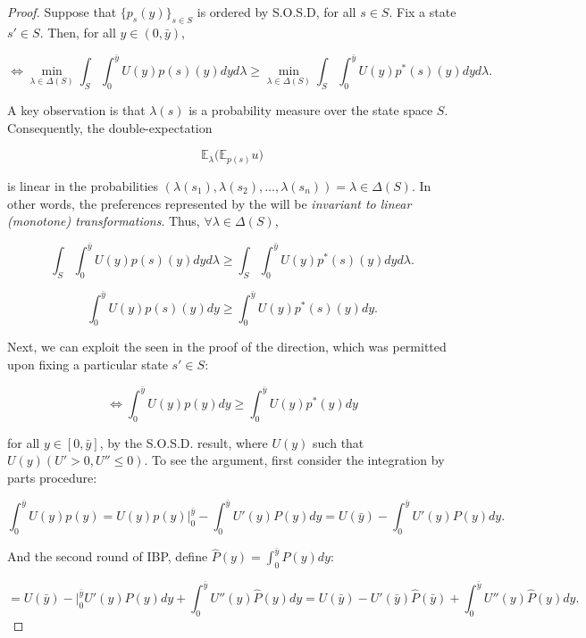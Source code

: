 \documentclass[\econtexRoot/IneqMeas]{subfiles}
\begin{document}
\begin{proof}

	\par Suppose that $\{ p_s(y) \}_{s \in S}$ is ordered by S.O.S.D, for all $s \in S$. Fix a state $s' \in S$. Then, for all $y \in (0, \bar{y})$,
	
$$  \iff  \min_{\lambda \in \Delta(S)} \int_{S} \int_{0}^{\bar{y}} U(y)p(s)(y) dy d \lambda \geq  \min_{\lambda \in \Delta(S)} \int_{S} \int_{0}^{\bar{y}} U(y)p^{*}(s)(y) dy  d \lambda. $$
	
	\par A key observation is that $\lambda(s)$ is a probability measure over the state space $S$. Consequently, the double-expectation 
	
$$ \mathbb{E}_{\lambda} \bigg( \mathbb{E}_{p(s)} u \bigg) $$

	\par is linear in the probabilities $(\lambda(s_1), \lambda(s_2), \ldots, \lambda(s_n)) = \lambda \in \Delta(S)$. In other words, the preferences represented by the  will be \textit{invariant to linear (monotone) transformations}. Thus, $\forall \lambda \in \Delta(S)$,
	
$$ \int_{S} \int_{0}^{\bar{y}} U(y)p(s)(y) dy d \lambda \geq \int_{S} \int_{0}^{\bar{y}} U(y)p^*(s)(y) dy d \lambda.$$	

$$  \int_{0}^{\bar{y}} U(y)p(s)(y) dy  \geq \int_{0}^{\bar{y}} U(y)p^*(s)(y) dy .$$	
	
	\par Next, we can exploit the  seen in the proof of the \say{$\rightarrow$} direction, which was permitted upon fixing a particular state $s' \in S$:
	
$$ \iff \int_{0}^{\bar{y}} U(y)p(y) dy \geq \int_{0}^{\bar{y}} U(y)p^*(y) dy  $$	

	\par for all $y \in [0, \bar{y}]$, by the S.O.S.D. result, where $U(y)$ such that $U(y) (U' > 0, U'' \leq 0)$. To see the argument, first consider the  integration by parts procedure:
	
$$ \int_{0}^{\bar{y}} U(y)p(y) = U(y)p(y) \bigg|_{0}^{\bar{y}} - \int_{0}^{\bar{y}} U'(y) P(y) dy = U(\bar{y}) - \int_{0}^{\bar{y}} U'(y) P(y) dy .$$	
	
	\par And the second round of IBP, define $\hat{P}(y) = \int_{0}^{\bar{y}} P(y)dy$:
	
$$ = U(\bar{y}) - \bigg|_{0}^{\bar{y}} U'(y) P(y) dy + \int_{0}^{\bar{y}} U''(y) \hat{P}(y) dy = U(\bar{y}) - U'(\bar{y}) \hat{P}(\bar{y}) + \int_{0}^{\bar{y}} U''(y) \hat{P}(y) dy.$$	


\end{proof}
\end{document}
